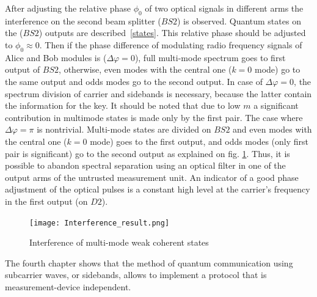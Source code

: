 After adjusting the relative phase $\phi_0$ of two optical signals in different arms the interference on the second beam splitter ($BS2$) is observed. Quantum states on the ($BS2$) outputs are described~\ref{states}. This relative phase should be adjusted to $\phi_0\approx0$. Then if the phase difference of modulating radio frequency signals of Alice and Bob modules is ($\Delta\varphi=0$), full multi-mode spectrum goes to first output of $BS2$, otherwise, even modes with the central one ($k = 0$ mode) go to the same output and odds modes go to the second output. In case of $\Delta\varphi=0$, the spectrum division of carrier and sidebands is necessary, because the latter contain the information for the key. It should be noted that due to low $m$ a significant contribution in multimode states is made only by the first pair. The case where $\Delta\varphi=\pi$ is nontrivial. Multi-mode states are divided on $BS2$ and even modes with the central one ($k = 0$ mode) goes to the first output, and odds modes (only first pair is significant) go to the second output as explained on fig. \ref{fig:Interference_result}. Thus, it is possible to abandon spectral separation using an optical filter in one of the output arms of the untrusted measurement unit. An indicator of a good phase adjustment of the optical pulses is a constant high level at the carrier's frequency in the first output (on $D2$).  


\begin{figure}[ht]
 \centering
  \texttt{[image: Interference\_result.png]}
  \caption{Interference of multi-mode weak coherent states}
  \label{fig:Interference_result}
\end{figure}

 
The fourth chapter shows that the method of quantum communication using subcarrier waves, or sidebands, allows to implement a protocol that is measurement-device independent.

